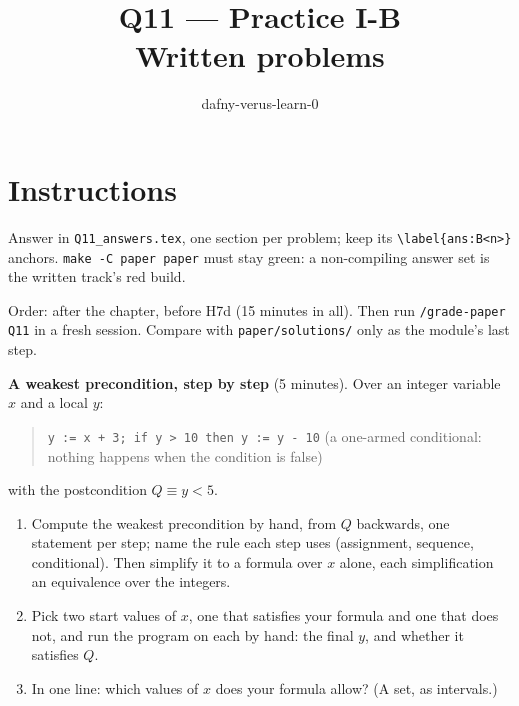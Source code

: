 \documentclass[11pt]{article}
\title{Q11 --- Practice I-B \\ \large Written problems}
\author{dafny-verus-learn-0}
\date{}
\begin{document}
\maketitle

\section*{Instructions}
Answer in \texttt{Q11\_answers.tex}, one section per problem; keep its
\verb+\label{ans:B<n>}+ anchors. \texttt{make -C paper paper} must stay green:
a non-compiling answer set is the written track's red build.

Order: after the chapter, before H7d (15 minutes in all). Then run
\texttt{/grade-paper Q11} in a fresh session. Compare with
\texttt{paper/solutions/} only as the module's last step.

\begin{problem}\label{prob:B1}
\textbf{A weakest precondition, step by step} (5 minutes). Over an integer
variable $x$ and a local $y$:
\begin{quote}
\texttt{y := x + 3; if y > 10 then y := y - 10} \qquad (a one-armed
conditional: nothing happens when the condition is false)
\end{quote}
with the postcondition $Q \equiv y < 5$.
\begin{enumerate}
\item[(a)] Compute the weakest precondition by hand, from $Q$ backwards, one
  statement per step; name the rule each step uses (assignment, sequence,
  conditional). Then simplify it to a formula over $x$ alone, each
  simplification an equivalence over the integers.
\item[(b)] Pick two start values of $x$, one that satisfies your formula and
  one that does not, and run the program on each by hand: the final $y$, and
  whether it satisfies $Q$.
\item[(c)] In one line: which values of $x$ does your formula allow? (A set,
  as intervals.)
\end{enumerate}
\end{problem}
\end{document}
